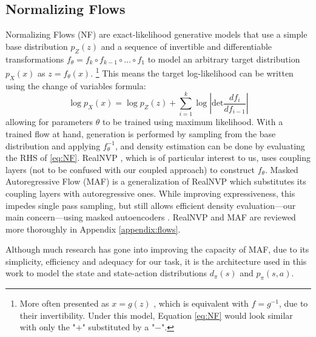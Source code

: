 \subsection{Normalizing Flows}\label{background:flows}
Normalizing Flows (NF) \cite{dinh2014nice,dinh2016density} are exact-likelihood generative models that use a simple base distribution $p_Z(z)$ and a sequence of invertible and differentiable transformations $f_{\theta} = f_k \circ f_{k-1} \circ \dots \circ f_1$ to model an arbitrary target distribution $p_X(x)$ as $z = f_{\theta}(x)$.
\footnote{More often presented as $x = g(z)$ \cite{papamakarios2021normalizing,kobyzev2020normalizing}, which is equivalent with $f=g^{-1}$, due to their invertibility. Under this model, Equation \eqref{eq:NF} would look similar with only the "$+$" substituted by a "$-$".}
This means the target log-likelihood can be written using the change of variables formula:
\begin{equation}\label{eq:NF}
\log p_X(x) =
\log  p_Z(z) + \sum_{i=1}^{k}{\log \left|\text{det}\frac{df_i}{df_{i-1}}\right|}
\end{equation}
allowing for parameters $\theta$ to be trained using maximum likelihood. With a trained flow at hand, generation is performed by sampling from the base distribution and applying $f_{\theta}^{-1}$, and density estimation can be done by evaluating the RHS of \eqref{eq:NF}. RealNVP \cite{dinh2016density}, which is of particular interest to us, uses coupling layers (not to be confused with our coupled approach) to construct $f_{\theta}$. Masked Autoregressive Flow (MAF) \cite{papamakarios2017masked} is a generalization of RealNVP which substitutes its coupling layers with autoregressive ones. While improving expressiveness, this impedes single pass sampling, but still allows efficient density evaluation—our main concern—using masked autoencoders \cite{germain2015made}. RealNVP and MAF are reviewed more thoroughly in Appendix \ref{appendix:flows}.


Although much research \cite{kingma2018glow,huang2018neural,durkan2019neural,ho2019flow++} has gone into improving the capacity of MAF, due to its simplicity, efficiency and adequacy for our task, it is the architecture used in this work to model the state and state-action distributions $d_\pi(s)$ and $p_\pi(s,a)$.


